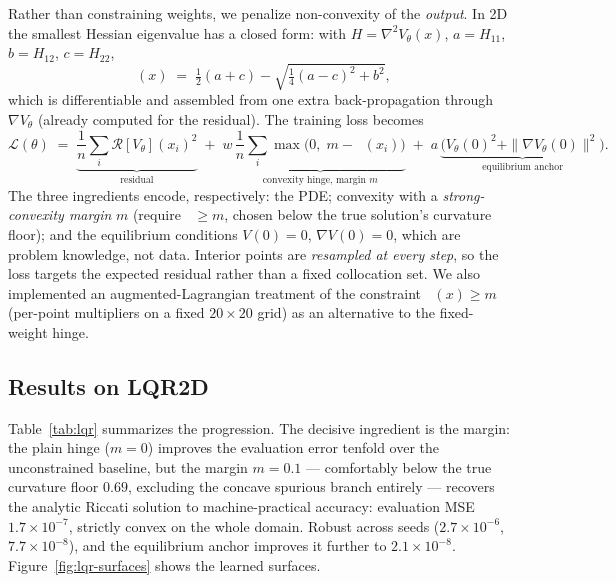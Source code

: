 \documentclass[11pt,a4paper]{article}
\newcommand{\loss}{\mathcal{L}}
\DeclareMathOperator{\lammin}{\lambda_{\min}}
\begin{document}
Rather than constraining weights, we penalize non-convexity of the
\emph{output}. In 2D the smallest Hessian eigenvalue has a closed form: with
$H = \nabla^2 V_\theta(x)$, $a = H_{11}$, $b = H_{12}$, $c = H_{22}$,
\begin{equation}
  \lammin(x) \;=\; \tfrac12 (a + c) - \sqrt{\tfrac14 (a-c)^2 + b^2},
\end{equation}
which is differentiable and assembled from one extra back-propagation
through $\nabla V_\theta$ (already computed for the residual). The training
loss becomes
\begin{equation}\label{eq:loss}
  \loss(\theta) \;=\;
  \underbrace{\frac1n \sum_{i} \mathcal{R}[V_\theta](x_i)^2}_{\text{residual}}
  \;+\; w \,\underbrace{\frac1n \sum_{i} \max\!\big(0,\; m - \lammin(x_i)\big)}_{\text{convexity hinge, margin } m}
  \;+\; a \,\underbrace{\big( V_\theta(0)^2 + \|\nabla V_\theta(0)\|^2 \big)}_{\text{equilibrium anchor}} .
\end{equation}
The three ingredients encode, respectively: the PDE; convexity with a
\emph{strong-convexity margin} $m$ (require $\lammin \ge m$, chosen below
the true solution's curvature floor); and the equilibrium conditions
$V(0)=0$, $\nabla V(0)=0$, which are problem knowledge, not data. Interior
points are \emph{resampled at every step}, so the loss targets the expected
residual rather than a fixed collocation set. We also implemented an
augmented-Lagrangian treatment of the constraint $\lammin(x)\ge m$
(per-point multipliers on a fixed $20\times20$ grid) as an alternative to
the fixed-weight hinge.

\subsection{Results on LQR2D}

Table~\ref{tab:lqr} summarizes the progression. The decisive ingredient is
the margin: the plain hinge ($m=0$) improves the evaluation error tenfold
over the unconstrained baseline, but the margin $m = 0.1$ --- comfortably
below the true curvature floor $0.69$, excluding the concave spurious branch
entirely --- recovers the analytic Riccati solution to machine-practical
accuracy: evaluation MSE $1.7\times10^{-7}$, strictly convex on the whole
domain. Robust across seeds ($2.7\times10^{-6}$, $7.7\times10^{-8}$), and
the equilibrium anchor improves it further to $2.1\times10^{-8}$.
Figure~\ref{fig:lqr-surfaces} shows the learned surfaces.
\end{document}
